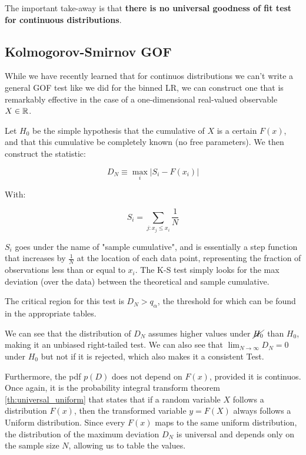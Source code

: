 The important take-away is that \textbf{there is no universal goodness of fit test for continuous distributions}.

\subsection{Kolmogorov-Smirnov GOF}

While we have recently learned that for continuos distributions we can't write a general GOF test like we did for the binned LR, we can construct one that is remarkably effective in the case of a one-dimensional real-valued observable $X\in\mathbb{R}$.

Let $H_0$ be the simple hypothesis that the cumulative of $X$ is a certain $F(x)$, and that this cumulative be completely known (no free parameters). We then construct the statistic:

\begin{equation}
	D_N \equiv \max_i\left|S_i - F\left(x_i\right)\right|
\tag{Kolmogorov-Smirnov Test}
\label{eq:KS_Test}
\end{equation}

With:

	\[
	S_i = \sum_{j:x_j\leq x_i}\frac{1}{N}
	\]

$S_i$ goes under the name of "sample cumulative", and is essentially a step function that increases by $\frac{1}{N}$ at the location of each data point, representing the fraction of observations less than or equal to $x_i$. The K-S test simply looks for the max  deviation (over the data) between the theoretical and sample cumulative. 

The critical region for this test is $D_N>q_\alpha$, the threshold for which can be found in the appropriate tables. 

We can see that the distribution of $D_N$ assumes higher values under $\cancel{H_0}$ than $H_0$, making it an unbiased right-tailed test. We can also see that $\lim_{N \to \infty} D_N = 0$ under $H_0$ but not if it is rejected, which also makes it a consistent Test.

Furthermore, the pdf $p(D)$ does not depend on $F(x)$, provided it is continuos. Once again, it is the probability integral transform theorem \ref{th:universal_uniform} that states that if a random variable $X$ follows a distribution $F(x)$, then the transformed variable $y = F(X)$ always follows a Uniform distribution. Since every $F(x)$ maps to the same uniform distribution, the distribution of the maximum deviation $D_N$ is universal and depends only on the sample size $N$, allowing us to table the values.

